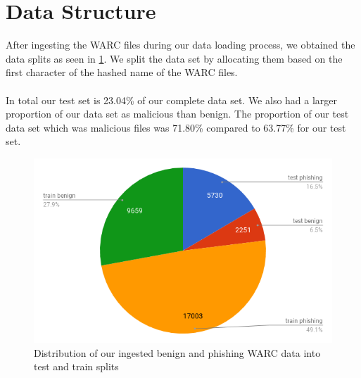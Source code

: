 \documentclass[12pt,twoside]{report}
\begin{document}
\section{Data Structure}
After ingesting the WARC files during our data loading process, we obtained the data splits as seen in \ref{fig:datastructure}. We split the data set by allocating them based on the first character of the hashed name of the WARC files.
\\\\
In total our test set is 23.04\% of our complete data set. We also had a larger proportion of our data set as malicious than benign. The proportion of our test data set which was malicious files was 71.80\% compared to 63.77\% for our test set.
\\
\begin{figure}[h]
    \centering
    \includegraphics[width=0.8\linewidth]{images/datastructure.png}
    \caption{Distribution of our ingested benign and phishing WARC data into test and train splits}
    \label{fig:datastructure}
\end{figure}
\end{document}
